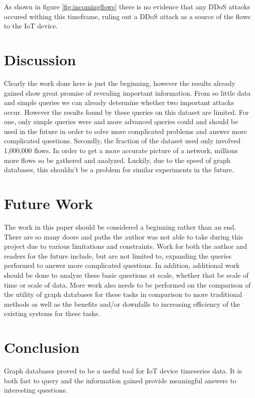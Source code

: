 \documentclass[conference]{IEEEtran}
\begin{document}
As shown in figure \ref{fig:incomingflows} there is no evidence that any DDoS attacks occured withing this timeframe,
ruling out a DDoS attack as a source of the flows to the IoT device. 

\section{Discussion}

Clearly the work done here is just the beginning, however the results already gained show great promise of revealing
important information. From so little data and simple queries we can already determine whether two important attacks
occur. However the results found by these queries on this dataset are limited. For one, only simple queries were
and more advanced queries could and should be used in the future in order to solve more complicated problems and
answer more complicated questions. Secondly, the fraction of the dataset used only involved 1,000,000 flows. In
order to get a more accurate picture of a network, millions more flows so be gathered and analyzed. Luckily,
due to the speed of graph databases, this shouldn't be a problem for similar experiments in the future. 

\section{Future Work}

The work in this paper should be considered a beginning rather than an end. There are so many doors and paths
the author was not able to take during this project due to various limitations and constraints. Work for both
the author and readers for the future include, but are not limited to, expanding the queries performed to answer
more complicated questions. In addition, additional work should be done to analyze these basic questions at scale,
whether that be scale of time or scale of data. More work also needs to be performed on the comparison of the
utility of graph databases for these tasks in comparison to more traditional methods as well as the benefits
and/or downfalls to increasing efficiency of the existing systems for these tasks.

\section{Conclusion}
Graph databases proved to be a useful tool for IoT device timeseries data. It is both fast to query and the
information gained provide meaningful answers to interesting questions.

\printbibliography
\end{document}
